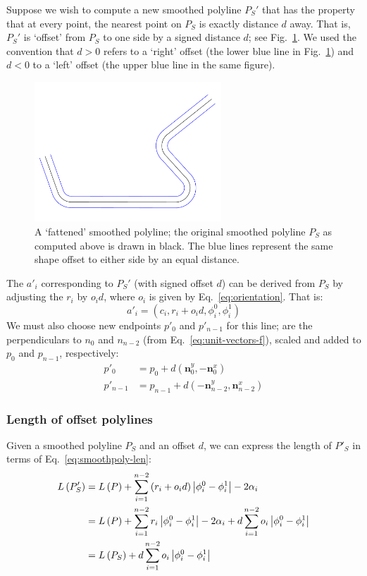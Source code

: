 \documentclass{article}
\begin{document}
Suppose we wish to compute a new smoothed polyline $P_S'$ that has the property that at every point, the nearest point on $P_S$ is exactly distance $d$ away.  That is, $P_S'$ is `offset' from $P_S$ to one side by a signed distance $d$; see Fig.~\ref{fig:fattened-polyline}.  We used the convention that $d>0$ refers to a `right' offset (the lower blue line in Fig.~\ref{fig:fattened-polyline}) and $d<0$ to a `left' offset (the upper blue line in the same figure).
%
\begin{figure}[h]
  \centering
  \includegraphics[width=7cm]{5}
  \caption{A `fattened' smoothed polyline; the original smoothed polyline $P_S$ as computed above is drawn in black.  The blue lines represent the same shape offset to either side by an equal distance.}
  \label{fig:fattened-polyline}
\end{figure}
%
The $a'_i$ corresponding to $P_S'$ (with signed offset $d$) can be derived from $P_S$ by adjusting the $r_i$ by $o_id$, where $o_i$ is given by Eq.~\eqref{eq:orientation}.  That is:
%
\begin{equation}
  \label{eq:arc-offset}
  a'_i = \left(c_i, r_i + o_id, \phi^0_i, \phi^1_i\right)
\end{equation}
%
We must also choose new endpoints $p'_0$ and $p'_{n-1}$ for this line;  are the perpendiculars to $n_0$ and $n_{n-2}$ (from Eq.~\eqref{eq:unit-vectors-f}), scaled and added to $p_0$ and $p_{n-1}$, respectively:
%
\begin{align}
  \label{eq:endpoints-prime}
  p'_0 &= p_0 + d \left(\mathbf{n}_0^y, -\mathbf{n}_0^x\right)\\
  p'_{n-1} &= p_{n-1} + d \left(-\mathbf{n}_{n-2}^y, \mathbf{n}_{n-2}^x\right)
\end{align}
%
\subsubsection{Length of offset polylines}
\label{sec:length-offs-polyl}
%
Given a smoothed polyline $P_S$ and an offset $d$, we can express the length of $P'_S$ in terms of Eq.~\eqref{eq:smoothpoly-len}:
%
\begin{align}
  \notag
  L\left(P'_S\right) &= L\left(P\right) + \sum^{n-2}_{i = 1} \left(r_i + o_id\right)\left|\phi^0_i - \phi^1_i\right| - 2\alpha_i\\
  \notag
  &= L\left(P\right) + \sum^{n-2}_{i = 1} r_i\left|\phi^0_i - \phi^1_i\right| - 2\alpha_i + d\sum^{n-2}_{i = 1}  o_i\left|\phi^0_i - \phi^1_i\right|\\
  &= L\left(P_S\right) + d\sum^{n-2}_{i = 1}  o_i\left|\phi^0_i - \phi^1_i\right|
\end{align}
%
\end{document}
